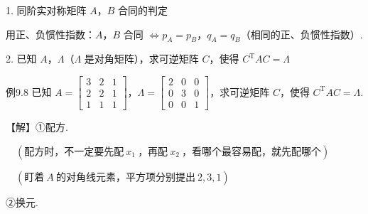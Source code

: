

1. 同阶实对称矩阵 $A$，$B$ 合同的判定

用正、负惯性指数：$A$，$B$ 合同 $\iff p_A=p_B$，$q_A=q_B$（相同的正、负惯性指数）.

2. 已知 $A$，$\Lambda$（$\Lambda$ 是对角矩阵），求可逆矩阵 $C$，使得 $C^{\mathrm T}AC=\Lambda$

\begin{fcard}{例9.8}
已知 $A=\begin{bmatrix}3&2&1\\2&2&1\\1&1&1\end{bmatrix}$，$\Lambda=\begin{bmatrix}2&0&0\\0&3&0\\0&0&1\end{bmatrix}$，求可逆矩阵 $C$，使得 $C^{\mathrm T}AC=\Lambda$.

【解】①配方.



$\quad(\text{配方时，不一定要先配}\ x_1\ \text{，再配}\ x_2\ \text{，看哪个最容易配，就先配哪个})$

$\quad(\text{盯着}\ A\ \text{的对角线元素，平方项分别提出}\ 2,3,1)$


②换元.


\end{fcard}
